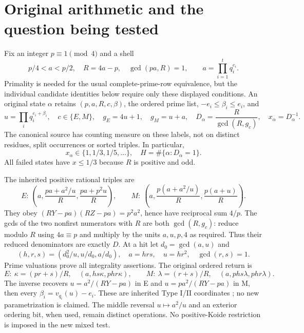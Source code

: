 \section{Original arithmetic and the question being tested}
Fix an integer $p\equiv1\pmod4$ and a shell
\[
 p/4<a<p/2,\quad R=4a-p,\quad \gcd(pa,R)=1,\qquad
 a=\prod_{i=1}^tq_i^{e_i}.
\]
Primality is needed for the usual complete-prime-row equivalence, but the
individual candidate identities below require only these displayed conditions.
An original state $\alpha$ retains $(p,a,R,c,\beta)$, the ordered prime list,
$-e_i\le\beta_i\le e_i$, and
\[
 u=\prod_iq_i^{e_i+\beta_i},\quad c\in\{E,M\},\quad
 g_E=4u+1,\quad g_M=u+a,\quad
 D_\alpha=\frac R{\gcd(R,g_c)},\quad x_\alpha=D_\alpha^{-1}.
 \tag{A1}
\]
The canonical source has counting measure on these labels, not on distinct
residues, split occurrences or sorted triples. In particular,
\[
 x_\alpha\in\{1,1/3,1/5,\ldots\},\quad
 H=\#\{\alpha:D_\alpha=1\}.
 \tag{A2}
\]
All failed states have $x\le1/3$ because $R$ is positive and odd.

The inherited positive rational triples are
\[
 E:\ \left(a,\frac{pa+a^2/u}{R},\frac{pa+p^2u}{R}\right),\qquad
 M:\ \left(a,\frac{p(a+a^2/u)}{R},\frac{p(a+u)}{R}\right).
 \tag{A3}
\]
They obey $(RY-pa)(RZ-pa)=p^2a^2$, hence have reciprocal sum $4/p$.
The gcds of the two nonfirst numerators with $R$ are both
$\gcd(R,g_c)$: reduce modulo $R$ using $4a\equiv p$ and multiply by the
units $a,u,p,4$ as required. Thus their reduced denominators are exactly $D$.
At a hit let $d_0=\gcd(a,u)$ and
\[
 (h,r,s)=(d_0^2/u,u/d_0,a/d_0),\quad
 a=hrs,\quad u=hr^2,\quad \gcd(r,s)=1.
\]
Prime valuations prove all integrality assertions. The original ordered return is
\[
 E:\ \kappa=(pr+s)/R,\quad(a,hs\kappa,phr\kappa),\qquad
 M:\ \lambda=(r+s)/R,\quad(a,phs\lambda,phr\lambda).
 \tag{A4}
\]
The inverse recovers $u=a^2/(RY-pa)$ in E and $u=pa^2/(RY-pa)$ in M,
then every $\beta_i=v_{q_i}(u)-e_i$. These are inherited Type I/II coordinates
\cite[\S2, Propositions 2.2 and 2.6]{ET}; no new parametrization is claimed.
The middle reversal $u\mapsto a^2/u$ and an exterior ordering bit, when used,
remain distinct operations. No positive-Koide restriction is imposed in the new
mixed test.

